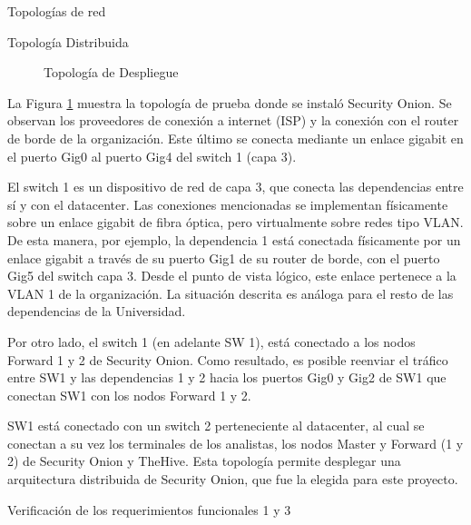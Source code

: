 \begin{section}{Topologías de red }
\begin{subsection} {Topología Distribuida}
\begin{figure}[H]
                \caption{Topología de Despliegue}
                \label{fig:topologia_despliegue_proyecto}
            \end{figure}
            \FloatBarrier
             La Figura \ref{fig:topologia_despliegue_proyecto} muestra la topología de prueba donde se instaló Security Onion. Se observan los proveedores de conexión a internet (ISP) y la conexión con el router de borde de la organización. Este último se conecta mediante un enlace gigabit en el puerto Gig0 al puerto Gig4 del switch 1 (capa 3). \par
             El switch 1 es un dispositivo de red de capa 3, que conecta las dependencias entre sí y con el datacenter. Las conexiones mencionadas se implementan físicamente sobre un enlace gigabit de fibra óptica, pero virtualmente sobre redes tipo VLAN. De esta manera, por ejemplo, la dependencia 1 está conectada físicamente por un enlace gigabit a través de su puerto Gig1 de su router de borde, con el puerto Gig5 del switch capa 3. Desde el punto de vista lógico, este enlace pertenece a la VLAN 1 de la organización. La situación descrita es análoga para el resto de las dependencias de la Universidad.\par
            Por otro lado, el switch 1 (en adelante SW 1), está conectado a los nodos Forward 1 y 2 de Security Onion. Como resultado, es posible reenviar el tráfico entre SW1 y las dependencias 1 y 2 hacia los puertos Gig0 y Gig2 de SW1 que conectan SW1 con los nodos Forward 1 y 2. \par
            SW1 está conectado con un switch 2 perteneciente al datacenter, al cual se conectan a su vez los terminales de los analistas, los nodos Master y Forward (1 y 2) de Security Onion y TheHive. Esta topología permite desplegar una arquitectura distribuida de Security Onion, que fue la elegida para este proyecto. 
        \end{subsection}

   \end{section}
    
    \begin{section}{Verificación de los requerimientos funcionales 1 y 3}
  
    \end{section}
   
